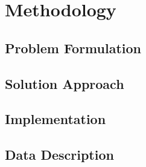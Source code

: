 \section{Methodology}

\subsection{Problem Formulation}

\subsection{Solution Approach}

\subsection{Implementation}

\subsection{Data Description}

